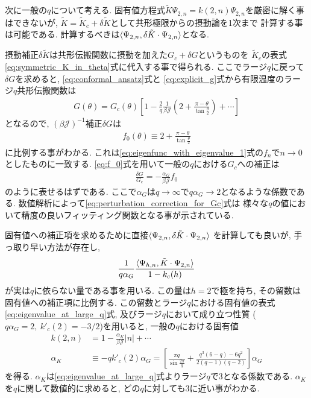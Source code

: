 次に一般の$q$について考える. 
固有値方程式$\tilde{K} \Psi_{2,n} = k(2, n)\Psi_{2,n}$を厳密に解く事はできないが, 
$\tilde{K} = \tilde{K}_c + \delta\tilde{K}$として共形極限からの摂動論を1次まで
計算する事は可能である. 
計算するべきは$\langle \Psi_{2,n}, \delta\tilde{K}\cdot\Psi_{2,n} \rangle$となる. 

摂動補正$\delta\tilde{K}$は共形伝搬関数に摂動を加えた$G_c + \delta G$というものを
$\tilde{K}_c$の表式\eqref{eq:symmetric_K_in_theta}式に代入する事で得られる. 
ここでラージ$q$に戻って$\delta G$を求めると, \eqref{eq:conformal_ansatz}式と
\eqref{eq:explicit_g}式から有限温度のラージ$q$共形伝搬関数は
\begin{align}
	G(\theta) = G_c(\theta)\left[
		1 - \frac{2}{q}\frac{1}{\beta\mathcal{J}}
		\left(2 + \frac{\pi - \theta}{\tan\frac{\theta}{2}}\right) + \cdots
	\right]
\end{align}
となるので, $(\beta\mathcal{J})^{-1}$補正$\delta G$は
\begin{align}
	f_0(\theta) \equiv 2 + \frac{\pi - \theta}{\tan\frac{\theta}{2}}
	\label{eq:f_0}
\end{align}
に比例する事がわかる. 
これは\eqref{eq:eigenfunc_with_eigenvalue_1}式の$f_n$で$n\to 0$としたものに一致する. 
\eqref{eq:f_0}式を用いて一般の$q$における$G_c$への補正は
\begin{align}
	\frac{\delta G}{G_c} = -\frac{\alpha_G}{\beta\mathcal{J}}f_0
	\label{eq:perturbation_correction_for_Gc}
\end{align}
のように表せるはずである. 
ここで$\alpha_G$は$q\to\infty$で$q\alpha_G\to 2$となるような係数である. 
数値解析によって\eqref{eq:perturbation_correction_for_Gc}式は
様々な$q$の値において精度の良いフィッティング関数となる事が示されている\cite{maldacena}. 

固有値への補正項を求めるために直接$\langle \Psi_{2,n}, \delta\tilde{K}\cdot\Psi_{2,n} \rangle$
を計算しても良いが, 手っ取り早い方法が存在し, 
\begin{align}
	\frac{1}{q\alpha_G}\frac{\langle \Psi_{h,n}, \tilde{K}\cdot\Psi_{2,n} \rangle}{1-k_c(h)}
\end{align}
が実は$q$に依らない量である事を用いる\cite{maldacena}. 
この量は$h=2$で極を持ち, その留数は固有値への補正項に比例する. 
この留数とラージ$q$における固有値の表式\eqref{eq:eigenvalue_at_large_q}式, 
及びラージ$q$において成り立つ性質
($q\alpha_G = 2,\ k'_c(2) = -3/2$)を用いると, 一般の$q$における固有値
\begin{align}
	k(2, n) &= 1 - \frac{\alpha_K}{\beta\mathcal{J}}|n| + \cdots\\
	\alpha_K &\equiv -qk'_c(2)\alpha_G
		= \left[
			\frac{\pi q}{\sin\frac{2\pi}{q}} + \frac{q^3(6-q) - 6q^2}{2(q-1)(q-2)}
		\right]\alpha_G
	\label{eq:corrected_eigenvalue}
\end{align}
を得る. 
$\alpha_K$は\eqref{eq:eigenvalue_at_large_q}式よりラージ$q$で3となる係数である. 
$\alpha_K$を$q$に関して数値的に求めると, どの$q$に対しても3に近い事がわかる\cite{maldacena}. 

